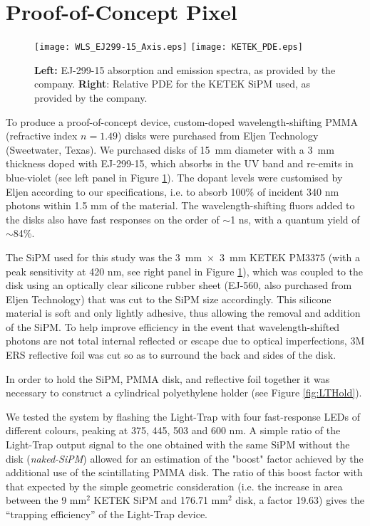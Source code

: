 \documentclass{PoS}
\begin{document}
\section{Proof-of-Concept Pixel}


\begin{figure}[t]
 \centering
\texttt{[image: WLS\_EJ299-15\_Axis.eps]}
\texttt{[image: KETEK\_PDE.eps]}
  \caption{\textbf{Left:} EJ-299-15 absorption and emission spectra, as provided by the company. \textbf{Right}: Relative PDE for the KETEK SiPM used, as provided by the company.}\label{fig:EJ29915}
\end{figure}


To produce a proof-of-concept device, custom-doped wavelength-shifting PMMA (refractive index $n=1.49$) disks were purchased from Eljen Technology (Sweetwater, Texas). We purchased disks of 15~mm diameter with a 3~mm thickness doped with EJ-299-15, which absorbs in the UV band and re-emits in blue-violet (see left panel in Figure \ref{fig:EJ29915}). The dopant levels were customised by Eljen according to our specifications, i.e. to absorb 100\% of incident 340 nm photons within 1.5 mm of the material. The wavelength-shifting fluors added to the disks also have fast responses on the order of $\sim$1 ns, with a quantum yield of $\sim$84\%. 

The SiPM used for this study was the 3~mm~$\times$~3~mm KETEK PM3375 (with a peak sensitivity at 420 nm, see right panel in Figure \ref{fig:EJ29915}), which was coupled to the disk using an optically clear silicone rubber sheet (EJ-560, also purchased from Eljen Technology) that was cut to the SiPM size accordingly. This silicone material is soft and only lightly adhesive, thus allowing the removal and addition of the SiPM. To help improve efficiency in the event that wavelength-shifted photons are not total internal reflected or escape due to optical imperfections, 3M\textsuperscript{\textregistered} ERS reflective foil was cut so as to surround the back and sides of the disk. 

In order to hold the SiPM, PMMA disk, and reflective foil together it was necessary to construct a cylindrical polyethylene holder (see Figure \ref{fig:LTHold}).

We tested the system by flashing the Light-Trap with four fast-response LEDs of different colours, peaking at 375, 445, 503 and 600 nm. A simple ratio of the Light-Trap output signal to the one obtained with the same SiPM without the disk (\textit{naked-SiPM}) allowed for an estimation of the "boost" factor achieved by the additional use of the scintillating PMMA disk. The ratio of this boost factor with that expected by the simple geometric consideration (i.e. the increase in area between the 9 mm$^{2}$ KETEK SiPM and 176.71 mm$^{2}$ disk, a factor 19.63) gives the ``trapping efficiency'' of the Light-Trap device. 
\end{document}
